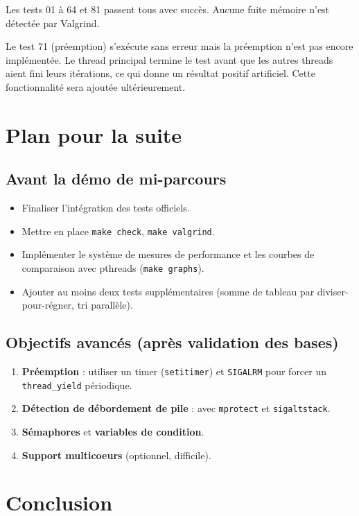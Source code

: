 \documentclass[12pt,a4paper]{article}
\begin{document}
Les tests 01 à 64 et 81 passent tous avec succès. Aucune fuite mémoire n'est détectée par Valgrind.

Le test 71 (préemption) s'exécute sans erreur mais la préemption n'est pas encore implémentée. Le thread principal termine le test avant que les autres threads aient fini leurs itérations, ce qui donne un résultat positif artificiel. Cette fonctionnalité sera ajoutée ultérieurement.

\section{Plan pour la suite}

\subsection{Avant la démo de mi-parcours}

\begin{itemize}
    \item Finaliser l’intégration des tests officiels.
    \item Mettre en place \texttt{make check}, \texttt{make valgrind}.
    \item Implémenter le système de mesures de performance et les courbes de comparaison avec pthreads (\texttt{make graphs}).
    \item Ajouter au moins deux tests supplémentaires (somme de tableau par diviser-pour-régner, tri parallèle).
\end{itemize}

\subsection{Objectifs avancés (après validation des bases)}

\begin{enumerate}
    \item \textbf{Préemption} : utiliser un timer (\texttt{setitimer}) et \texttt{SIGALRM} pour forcer un \texttt{thread\_yield} périodique.
    \item \textbf{Détection de débordement de pile} : avec \texttt{mprotect} et \texttt{sigaltstack}.
    \item \textbf{Sémaphores} et \textbf{variables de condition}.
    \item \textbf{Support multicoeurs} (optionnel, difficile).
\end{enumerate}

\section{Conclusion}
\end{document}
